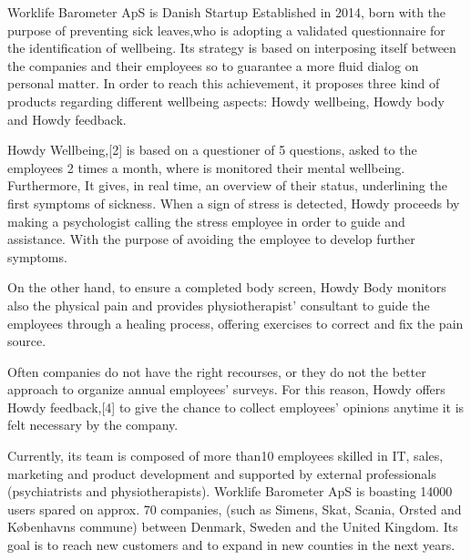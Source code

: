 


Worklife Barometer ApS is  Danish Startup Established in 2014, born with the purpose of preventing sick leaves,who is adopting a validated questionnaire for the identification of wellbeing. Its strategy is based on interposing itself between the companies and their employees so to guarantee a more fluid dialog on personal matter.     
In order to reach this achievement, it proposes three kind of products regarding different wellbeing aspects: Howdy wellbeing, Howdy body and Howdy feedback.\cite{howdywebsite}

\noindent Howdy Wellbeing,[2] is based on a questioner of 5 questions, asked to the employees 2 times a month, where is monitored their mental wellbeing. 
Furthermore, It gives, in real time, an overview of their status, underlining the first symptoms of sickness.
When a sign of stress is detected, Howdy proceeds by making a psychologist calling the stress employee in order to guide and assistance. With the purpose of avoiding the employee to develop further symptoms.

\noindent On the other hand, to ensure a completed body screen, Howdy Body \cite{howdywebsite} monitors also the physical pain and provides physiotherapist’ consultant to guide the employees through a healing process, offering exercises to correct and fix the pain source.

\noindent Often companies do not have the right recourses, or they do not the better approach to organize annual employees’ surveys. For this reason, Howdy offers Howdy feedback,[4] to give the chance to collect employees’ opinions anytime it is felt necessary by the company.

\noindent Currently, its team is composed of more than10 employees skilled in IT, sales, marketing and product development and supported by external professionals (psychiatrists and physiotherapists). Worklife Barometer ApS is boasting 14000 users spared on approx. 70 companies, (such as Simens, Skat, Scania, Orsted and Københavns commune) between Denmark, Sweden and the United Kingdom. Its goal is to reach new customers and to expand in new counties in the next years.\cite{howdywebsite}

